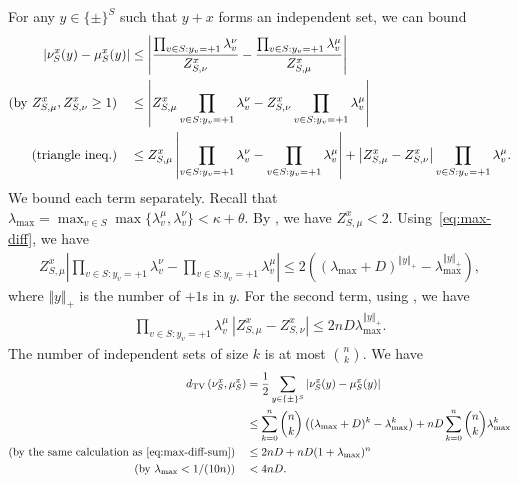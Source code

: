     For any $y \in \{\pm\}^S$ such that $y+x$ forms an independent set, we can bound 
    \begin{align}\label{eq:bound-diffy}
        \left|\nu_S^x(y)-\mu_S^x(y)\right| &\leq \left\vert \frac{ \prod_{v \in S: y_v= +1}\lambda_v^\nu }{Z_{S,\nu}^x } - \frac{\prod_{v \in S: y_v= +1}\lambda_v^\mu }{Z_{S,\mu}^x } \right\vert\notag\\
    \text{(by $Z_{S,\mu}^x,Z_{S,\nu}^x \geq 1$)}\quad    &\leq \left\vert Z_{S,\mu}^x \prod_{v \in S:y_v=+1}\lambda_v^\nu - Z_{S,\nu}^x \prod_{v \in S:y_v=+1}\lambda_v^\mu \right\vert\notag\\
    \text{(triangle ineq.)}\quad  &\leq Z_{S,\mu}^x\left\vert \prod_{v \in S:y_v=+1}\lambda_v^\nu -  \prod_{v \in S:y_v=+1}\lambda_v^\mu\right\vert + \left\vert Z_{S,\mu}^x - Z_{S,\nu}^x \right\vert\prod_{v \in S:y_v=+1}\lambda_v^\mu .
    \end{align}
    We bound each term separately. 
    Recall that $\lambda_{\max} = \max_{v \in S} \max \{\lambda_v^\mu,\lambda_v^\nu\} < \kappa + \theta$.
    By , we have $Z^x_{S,\mu} < 2$. Using~\eqref{eq:max-diff}, we have
    \begin{align}\label{eq:bound-diffy-1}
        Z_{S,\mu}^x\left\vert \prod_{v \in S:y_v=+1}\lambda_v^\nu -  \prod_{v \in S:y_v=+1}\lambda_v^\mu\right\vert \leq 2 \left((\lambda_{\max}+D)^{\Vert y \Vert_+} - \lambda_{\max}^{\Vert y \Vert_+}\right),
    \end{align}
    where $\Vert y \Vert_+$ is the number of $+1$s in $y$. For the second term, using , we have
    \begin{align}\label{eq:bound-diffy-2}
        \prod_{v \in S:y_v=+1}\lambda_v^\mu\ \left\vert Z_{S,\mu}^x - Z_{S,\nu}^x \right\vert \leq 2nD \lambda_{\max}^{\Vert y \Vert_+}.
    \end{align}
    The number of independent sets of size $k$ is at most $\binom{n}{k}$. We have
    \begin{align*}
        d_{\mathrm{TV}}\left({\nu_S^x},{\mu_S^x}\right)&= \frac{1}{2}\sum_{y \in \{\pm\}^S}\left|\nu_S^x(y)-\mu_S^x(y)\right|\\
        &\leq \sum_{k=0}^n \binom{n}{k}  \left((\lambda_{\max}+D)^k - \lambda_{\max}^k\right) +   nD \sum_{k=0}^n \binom{n}{k} \lambda_{\max}^{k}\\
    \text{(by the same calculation as~\eqref{eq:max-diff-sum})}\quad &\leq 2nD +nD (1+\lambda_{\max})^n\\
    \text{(by $\lambda_{\max} < 1 / (10n)$)}\quad &< 4nD.
    \end{align*}

